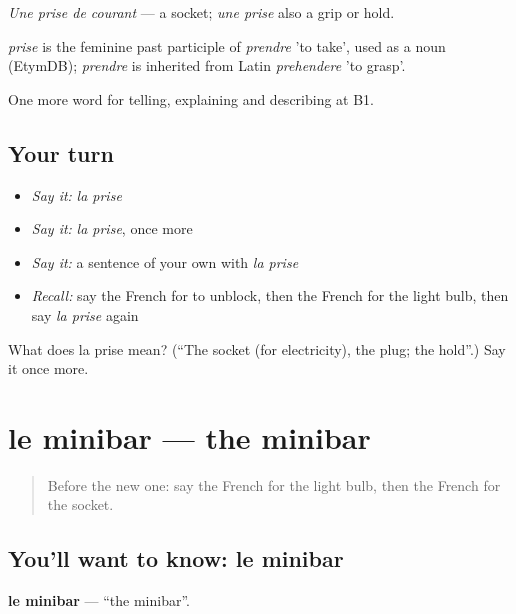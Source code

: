\emph{Une prise de courant} — a socket; \emph{une prise} also a grip or hold.

\begin{cousinweb}
\emph{prise} is the feminine past participle of \emph{prendre} 'to take', used as a noun (EtymDB); \emph{prendre} is inherited from Latin \emph{prehendere} 'to grasp'.
\end{cousinweb}

\begin{grammarlens}[title={What you've built}]
One more word for telling, explaining and describing at B1.
\end{grammarlens}

\subsection*{Your turn}
\begin{itemize}
\raggedright
  \item \emph{Say it:} \emph{la prise}
  \item \emph{Say it:} \emph{la prise}, once more
  \item \emph{Say it:} a sentence of your own with \emph{la prise}
  \item \emph{Recall:} say the French for to unblock, then the French for the light bulb, then say \emph{la prise} again
\end{itemize}

\begin{tcolorbox}[breakable,colback=teal!4,colframe=teal!35!black,title={Before you move on}]
What does la prise mean? (\textquotedblleft{}The socket (for electricity), the plug; the hold\textquotedblright{}.) Say it once more.
\end{tcolorbox}
\section[le minibar]{le minibar — the minibar}

\label{lesson:FR-C429-minibar}



\begin{quote}
Before the new one: say the French for the light bulb, then the French for the socket.
\end{quote}

\subsection*{You'll want to know: le minibar}
\textbf{le minibar} — \textquotedblleft{}the minibar\textquotedblright{}.

